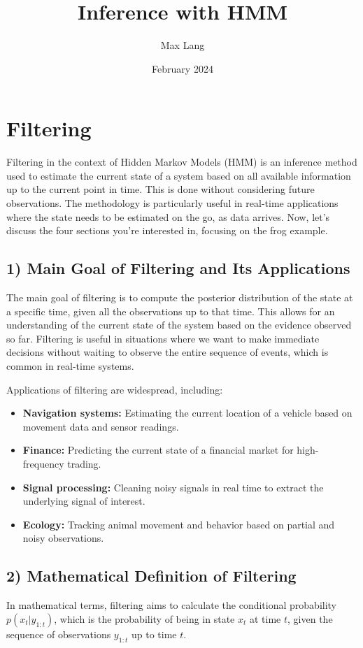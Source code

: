 \documentclass[10pt]{article}
\title{Inference with HMM}
\author{Max Lang}
\date{February 2024}
\begin{document}
\maketitle
\section{Filtering}
Filtering in the context of Hidden Markov Models (HMM) is an inference method used to estimate the current state of a system based on all available information up to the current point in time. This is done without considering future observations. The methodology is particularly useful in real-time applications where the state needs to be estimated on the go, as data arrives. Now, let's discuss the four sections you're interested in, focusing on the frog example.

\subsection*{1) Main Goal of Filtering and Its Applications}
The main goal of filtering is to compute the posterior distribution of the state at a specific time, given all the observations up to that time. This allows for an understanding of the current state of the system based on the evidence observed so far. Filtering is useful in situations where we want to make immediate decisions without waiting to observe the entire sequence of events, which is common in real-time systems.

Applications of filtering are widespread, including:

\begin{itemize}
  \item \textbf{Navigation systems:} Estimating the current location of a vehicle based on movement data and sensor readings.
  \item \textbf{Finance:} Predicting the current state of a financial market for high-frequency trading.
  \item \textbf{Signal processing:} Cleaning noisy signals in real time to extract the underlying signal of interest.
  \item \textbf{Ecology:} Tracking animal movement and behavior based on partial and noisy observations.
\end{itemize}

\subsection*{2) Mathematical Definition of Filtering}
In mathematical terms, filtering aims to calculate the conditional probability \( p(x_t | y_{1:t}) \), which is the probability of being in state \( x_t \) at time \( t \), given the sequence of observations \( y_{1:t} \) up to time \( t \).
\end{document}
